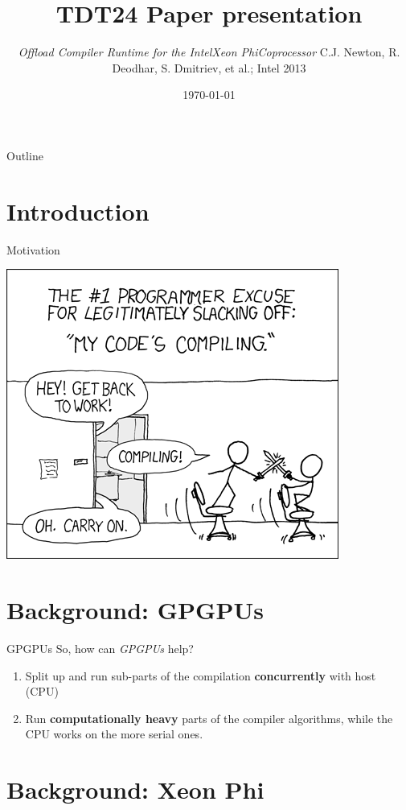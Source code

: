\documentclass[screen]{beamer}
\title[Compiler Offloading]{TDT24 Paper presentation}
\subtitle{\textit{Offload Compiler Runtime for the
Intel\circledR Xeon Phi\texttrademark Coprocessor} \newline C.J. Newton, R.
Deodhar, S. Dmitriev, et al.; Intel 2013}
\institute[IDI - NTNU]{Institutt for Datateknikk og Informasjonsvitenskap}
\date[November 2014]{\today} %
\begin{document}
\ntnutitlepage

\begin{frame}{Outline}
    \tableofcontents
\end{frame}

\section{Introduction}

\begin{frame}{Motivation}
    \pause
    \begin{center}
        \includegraphics[width=0.5\linewidth]{compiling.png}
    \end{center}
\end{frame}

\section{Background: GPGPUs}

\begin{frame}{GPGPUs}
    So, how can \textit{GPGPUs} help?
    \begin{enumerate}[<+-| alert@+>]
        \item Split up and run sub-parts of the compilation \textbf{concurrently} with host (CPU)
        \item Run \textbf{computationally heavy} parts of the compiler algorithms, while the CPU works on the more serial ones.
    \end{enumerate}
\end{frame}

\section{Background: Xeon Phi}
\end{document}
